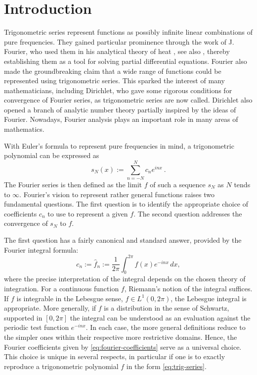 \section{Introduction}


Trigonometric series represent functions as possibly infinite linear combinations of pure frequencies.
They gained particular prominence through the work of J. Fourier, who used them in his analytical theory of heat \cite{Fourier}, see also \cite{MR3470070}, thereby establishing them as a tool for solving partial differential equations.
Fourier also made the groundbreaking claim that a wide range of functions could be represented using trigonometric series. This sparked the interest of many mathematicians,
including Dirichlet, who gave some rigorous conditions for convergence of Fourier series, as trigonometric series are now called. Dirichlet also opened a branch of analytic number theory partially inspired by the ideas of
Fourier.
Nowadays, Fourier analysis plays an important role in many areas of mathematics.


With Euler's formula to represent pure frequencies in mind, a trigonometric polynomial can be expressed as
\begin{equation}\label{eq:trig-series}
    s_N(x):= \sum_{n=-N}^N c_n e^{inx} \ .
\end{equation}
The Fourier series is then defined as the limit $f$
of such a sequence $s_N$ as $N$ tends to $\infty$.
Fourier's vision to represent rather general functions raises two fundamental questions.
The first question is to identify the appropriate choice of coefficients
$c_n$ to use to represent a given $f$. The second question addresses the convergence of $s_N$ to $f$.

The first question has a fairly canonical and standard answer, provided by the Fourier integral formula:
\begin{equation}\label{eq:fourier-coefficients}
    c_n:=\widehat{f}_n:=\frac 1{2\pi}\int_0^{2\pi}f(x) e^{- i nx}\, dx,
\end{equation}
 where the precise interpretation of the integral depends on the chosen theory of integration. For a continuous function $f$,
Riemann's notion of the integral suffices. If $f$ is integrable in the Lebesgue sense,
$f\in L^1(0,2\pi)$, the Lebesgue integral is appropriate. More generally, if
$f$ is a distribution in the sense of Schwartz, supported in $[0,2\pi]$
the integral can be understood as an evaluation against the periodic test function
$e^{-i nx}$. In each case, the more general definitions reduce to the simpler ones within their respective more restrictive domains.
Hence, the Fourier coefficients given by \eqref{eq:fourier-coefficients} serve as a universal choice.
This choice is unique in several respects, in particular if one is to exactly reproduce
a trigonometric polynomial $f$ in the form
\eqref{eq:trig-series}.


